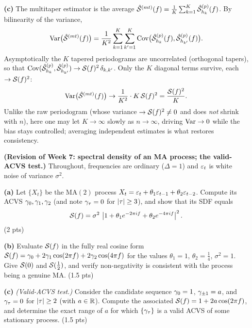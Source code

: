 \documentclass[11pt]{article}
\begin{document}
\textbf{(c)} The multitaper estimator is the average $\hat{\mathcal{S}}^{(mt)}(f)=\frac1K\sum_{k=1}^{K}\hat{\mathcal{S}}^{(p)}_{h_k}(f)$. By bilinearity of the variance,
\[
\operatorname{Var}\bigl(\hat{\mathcal{S}}^{(mt)}(f)\bigr)
=\frac{1}{K^2}\sum_{k=1}^{K}\sum_{k'=1}^{K}\operatorname{Cov}\bigl(\hat{\mathcal{S}}^{(p)}_{h_k}(f),\hat{\mathcal{S}}^{(p)}_{h_{k'}}(f)\bigr).
\]
Asymptotically the $K$ tapered periodograms are uncorrelated (orthogonal tapers), so that $\operatorname{Cov}(\hat{\mathcal{S}}^{(p)}_{h_k},\hat{\mathcal{S}}^{(p)}_{h_{k'}})\to\mathcal{S}(f)^2\,\delta_{k,k'}$. Only the $K$ diagonal terms survive, each $\to\mathcal{S}(f)^2$:
\[
\operatorname{Var}\bigl(\hat{\mathcal{S}}^{(mt)}(f)\bigr)\to\frac{1}{K^2}\cdot K\,\mathcal{S}(f)^2=\frac{\mathcal{S}(f)^2}{K}.
\]
Unlike the raw periodogram (whose variance $\to\mathcal{S}(f)^2\ne0$ and does \emph{not} shrink with $n$), here one may let $K\to\infty$ slowly as $n\to\infty$, driving $\operatorname{Var}\to0$ while the bias stays controlled; averaging independent estimates is what restores consistency.

\statementstart
\textbf{(Revision of Week 7: spectral density of an MA process; the valid-ACVS test.)} Throughout, frequencies are ordinary ($\Delta=1$) and $\varepsilon_t$ is white noise of variance $\sigma^2$.

\textbf{(a)} Let $\{X_t\}$ be the $\mathrm{MA}(2)$ process $X_t=\varepsilon_t+\theta_1\varepsilon_{t-1}+\theta_2\varepsilon_{t-2}$. Compute its ACVS $\gamma_0,\gamma_1,\gamma_2$ (and note $\gamma_\tau=0$ for $\left\lvert \tau \right\rvert\ge3$), and show that its SDF equals
\[
\mathcal{S}(f)=\sigma^2\,\left\lvert 1+\theta_1 e^{-2\pi i f}+\theta_2 e^{-4\pi i f} \right\rvert^2 .
\]
\hfill(2 pts)

\textbf{(b)} Evaluate $\mathcal{S}(f)$ in the fully real cosine form $\mathcal{S}(f)=\gamma_0+2\gamma_1\cos(2\pi f)+2\gamma_2\cos(4\pi f)$ for the values $\theta_1=1$, $\theta_2=\tfrac14$, $\sigma^2=1$. Give $\mathcal{S}(0)$ and $\mathcal{S}(\tfrac12)$, and verify non-negativity is consistent with the process being a genuine MA. \hfill(1.5 pts)

\textbf{(c)} \emph{(Valid-ACVS test.)} Consider the candidate sequence $\gamma_0=1$, $\gamma_{\pm1}=a$, and $\gamma_\tau=0$ for $\left\lvert \tau \right\rvert\ge2$ (with $a\in\mathbb{R}$). Compute the associated $\mathcal{S}(f)=1+2a\cos(2\pi f)$, and determine the exact range of $a$ for which $\{\gamma_\tau\}$ is a valid ACVS of some stationary process. \hfill(1.5 pts)
\statementend
\end{document}
